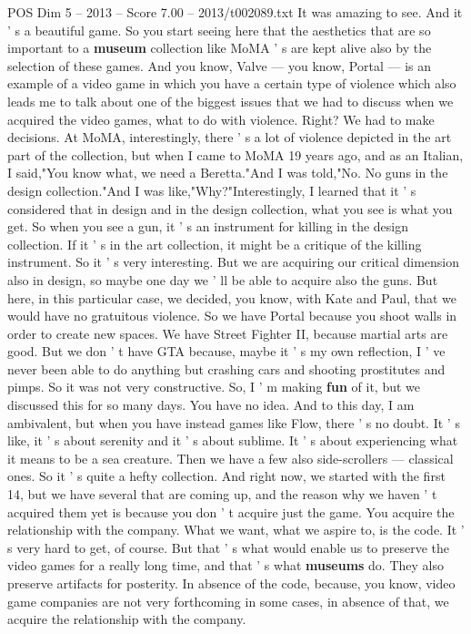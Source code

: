 \begin{textsample}{POS Dim 5 – 2013 – Score 7.00 – 2013/t002089.txt}
It was amazing to see.
And it ' s a beautiful game.
So you start seeing here that the aesthetics that are so important to a \textbf{museum} collection like MoMA ' s are kept alive also by the selection of these games.
And you know, Valve — you know, Portal — is an example of a video game in which you have a certain type of violence which also leads me to talk about one of the biggest issues that we had to discuss when we acquired the video games, what to do with violence.
Right?
We had to make decisions.
At MoMA, interestingly, there ' s a lot of violence depicted in the art part of the collection, but when I came to MoMA 19 years ago, and as an Italian, I said,"You know what, we need a Beretta."And I was told,"No.
No guns in the design collection."And I was like,"Why?"Interestingly, I learned that it ' s considered that in design and in the design collection, what you see is what you get.
So when you see a gun, it ' s an instrument for killing in the design collection.
If it ' s in the art collection, it might be a critique of the killing instrument.
So it ' s very interesting.
But we are acquiring our critical dimension also in design, so maybe one day we ' ll be able to acquire also the guns.
But here, in this particular case, we decided, you know, with Kate and Paul, that we would have no gratuitous violence.
So we have Portal because you shoot walls in order to create new spaces.
We have Street Fighter II, because martial arts are good.
But we don ' t have GTA because, maybe it ' s my own reflection, I ' ve never been able to do anything but crashing cars and shooting prostitutes and pimps.
So it was not very constructive.
So, I ' m making \textbf{fun} of it, but we discussed this for so many days.
You have no idea.
And to this day, I am ambivalent, but when you have instead games like Flow, there ' s no doubt.
It ' s like, it ' s about serenity and it ' s about sublime.
It ' s about experiencing what it means to be a sea creature.
Then we have a few also side-scrollers — classical ones.
So it ' s quite a hefty collection.
And right now, we started with the first 14, but we have several that are coming up, and the reason why we haven ' t acquired them yet is because you don ' t acquire just the game.
You acquire the relationship with the company.
What we want, what we aspire to, is the code.
It ' s very hard to get, of course.
But that ' s what would enable us to preserve the video games for a really long time, and that ' s what \textbf{museums} do.
They also preserve artifacts for posterity.
In absence of the code, because, you know, video game companies are not very forthcoming in some cases, in absence of that, we acquire the relationship with the company.

\end{textsample}
